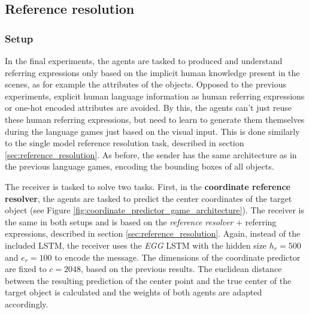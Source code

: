 \subsection{Reference resolution}
\subsubsection*{Setup}
In the final experiments, the agents are tasked to produced and understand referring expressions only based on the implicit human knowledge present in the scenes, as for example the attributes of the objects.
Opposed to the previous experiments, explicit human language information as human referring expressions or one-hot encoded attributes are avoided.
By this, the agents can't just reuse these human referring expressions, but need to learn to generate them themselves during the language games just based on the visual input.
This is done similarly to the single model reference resolution task, described in section \ref{sec:reference_resolution}.
As before, the sender has the same architecture as in the previous language games, encoding the bounding boxes of all objects.

The receiver is tasked to solve two tasks.
First, in the \textbf{coordinate reference resolver}, the agents are tasked to predict the center coordinates of the target object (see Figure \ref{fig:coordinate_predictor_game_architecture}).
The receiver is the same in both setups and is based on the \emph{reference resolver} + referring expressions, described in section \ref{sec:reference_resolution}.
Again, instead of the included LSTM, the receiver uses the \emph{EGG} LSTM with the hidden size $h_r=500$ and $e_r=100$ to encode the message.
The dimensions of the coordinate predictor are fixed to $c=2048$, based on the previous results.
The euclidean distance between the resulting prediction of the center point and the true center of the target object is calculated and the weights of both agents are adapted accordingly.

